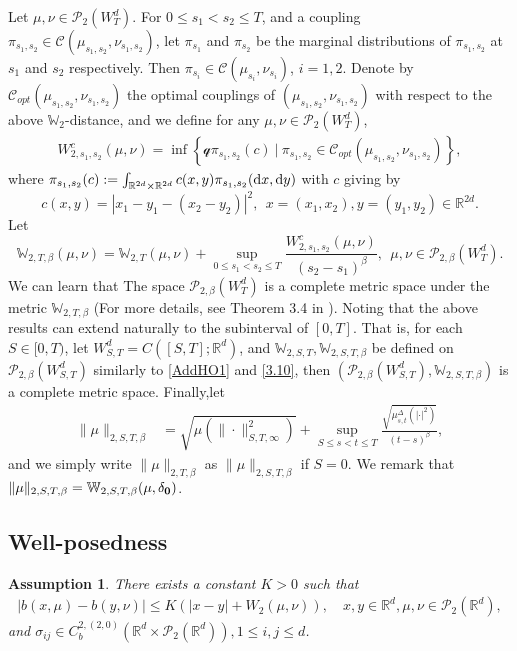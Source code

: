 \documentclass[12pt]{article}
\newtheorem{assumption}[theorem]{Assumption}
\def\R{\mathbb R}
\def\d{\text{\rm{d}}}
\def\de{\delta}
\def\pb{\mathscr{P}}
\def\W{\mathbb{W}}
\numberwithin{equation}{section}
\begin{document}
	Let $\mu,\nu\in\mathscr P_2(W_T^d)$. For $0\leq s_1<s_2\leq T$, and a coupling $\pi_{s_1,s_2}\in \mathscr C(\mu_{s_1,s_2},\nu_{s_1,s_2})$, let $\pi_{s_1}$ and $\pi_{s_2}$  be the marginal distributions of $\pi_{s_1,s_2}$ at $s_1$ and $s_2$ respectively. Then $\pi_{s_i}\in\mathscr C(\mu_{s_i},\nu_{s_i})$, $i=1,2$. Denote by $\mathscr C_{opt}(\mu_{s_1,s_2},\nu_{s_1,s_2})$ the optimal couplings of $(\mu_{s_1,s_2},\nu_{s_1,s_2})$ with respect to the above $\W_2$-distance, %
	and we define for any $\mu,\nu\in\mathscr P_2(W_T^d)$,
	\begin{align}\label{AddHO2}
		W_{2,s_1,s_2}^c(\mu,\nu)=\inf\left\{\mathscr q{\pi_{s_1,s_2}(c)}~\Big|~\pi_{s_1,s_2}\in \mathscr C_{opt}(\mu_{s_1,s_2},\nu_{s_1,s_2})\right\},
	\end{align}
	where
	$\pi_{s_1,s_2}(c):=\int_{\R^{2d}\times\R^{2d}} c(x,y)\pi_{s_1,s_2}(\d x ,\d y)$ with $c$ giving by
	\[c(x,y)=|x_1-y_1-(x_2-y_2)|^2, \ \ x=(x_1,x_2),y=(y_1,y_2)\in\R^{2d}.\]	
	Let
	\begin{equation}\label{3.10}
		\W_{2,T,\beta}(\mu,\nu)=\W_{2,T}(\mu,\nu)+\sup_{0\leq s_1<s_2\leq T}\frac {W_{2,s_1,s_2}^c(\mu,\nu)} {(s_2-s_1)^\beta},\ \ \mu,\nu\in\mathscr P_{2,\beta}(W_T^d).
	\end{equation}
	We can learn that The space $\mathscr P_{2,\beta}(W_T^d)$ is a complete metric space under the metric $\W_{2,T,\beta}$ (For more details, see Theorem 3.4 in \cite{fan}). Noting that the above results can extend naturally to the subinterval of $[0,T]$.
	That is, for each $S\in[0,T)$, let $W_{S,T}^d=C([S,T];\R^d)$, and $\W_{2,S,T}, \W_{2,S,T,\beta}$ be defined on $\mathscr P_{2,\beta}(W_{S,T}^d)$ similarly
	to \eqref{AddHO1} and \eqref{3.10}, then $(\mathscr P_{2,\beta}(W_{S,T}^d),\W_{2,S,T,\beta})$ is a complete metric space.
	Finally,let
	\begin{align}\label{AddDef}
		\|\mu\|_{2,S,T,\beta}&=\sqrt{\mu(\|\cdot\|_{S,T,\infty}^2)}+\sup_{S\leq s<t\leq T}\frac {\sqrt{\mu_{s,t}^\Delta(|\cdot|^2)}} {(t-s)^\beta},
	\end{align}
	and we simply write $\|\mu\|_{2,T,\beta}$ as $\|\mu\|_{2,S,T,\beta}$ if $S=0$. We remark that $\|\mu\|_{2,S,T,\beta}=\W_{2,S,T,\beta}(\mu,\de_{\bf 0})$.
	
	
	\subsection{Well-posedness}
	\begin{assumption}\label{ass-2.3}
		There exists a constant $K > 0$ such that
		\begin{align*}
			|b(x,\mu)-b(y,\nu)|\leq K(|x-y|+W_2(\mu,\nu)),\quad x,y\in \R^d, \mu,\nu\in\pb_2(\R^d),
		\end{align*}
		and $\sigma_{ij}\in C_b^{2,(2,0)}(\R^d\times\pb_2(\R^d)),1\leq i,j \leq d$.
	\end{assumption}
	
\end{document}
